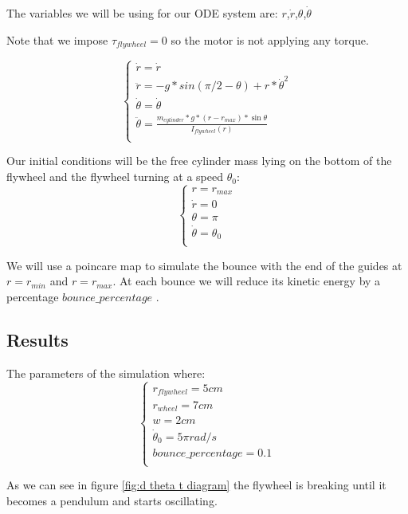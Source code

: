 The variables we will be using for our ODE system are: $r$,$\dot{r}$,$\theta$,$\dot{\theta}$

Note that we impose $\tau_{flywheel} = 0$ so the motor is not applying any torque.

\[
\begin{cases}
    \dot{r} = \dot{r}\\
    \ddot{r} = -g * sin(\pi/2-\theta) + r * \dot{\theta}^2\\
    \dot{\theta} = \dot{\theta}\\
    \ddot{\theta} = \frac{m_{cylinder} * g * (r - r_{max}) * \sin{\theta}}{I_{flywheel}(r)} \\    
\end{cases}
\]


Our initial conditions will be the free cylinder mass lying on the bottom of the flywheel and the flywheel turning at a speed $\theta_0$:
\[
    \begin{cases}
        r = r_{max} \\
        \dot{r} = 0\\
        \theta = \pi\\
        \dot{\theta} = \theta_0\\
    \end{cases}
\]

We will use a poincare map to simulate the bounce with the end of the guides at $r=r_{min}$ and $r=r_{max}$. At each bounce we will reduce its kinetic energy by a percentage $bounce\_percentage$ .

\subsection{Results}
The parameters of the simulation where:
\[
\begin{cases}
	r_{flywheel} = 5cm \\
	r_{wheel} = 7cm \\
	w = 2 cm \\
	\dot{\theta}_0 = 5 \pi rad/s \\
	bounce\_percentage = 0.1 \\	
\end{cases}	
\]

As we can see in figure \ref{fig:d theta t diagram} the flywheel is breaking until it becomes a pendulum and starts oscillating.

